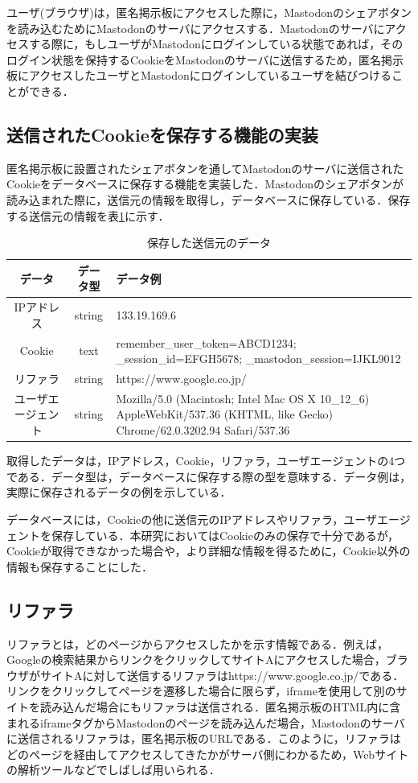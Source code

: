 \documentclass[10pt, a4paper]{jreport}
\begin{document}
ユーザ(ブラウザ)は，匿名掲示板にアクセスした際に，Mastodonのシェアボタンを読み込むためにMastodonのサーバにアクセスする．Mastodonのサーバにアクセスする際に，もしユーザがMastodonにログインしている状態であれば，そのログイン状態を保持するCookieをMastodonのサーバに送信するため，匿名掲示板にアクセスしたユーザとMastodonにログインしているユーザを結びつけることができる．

\subsection{送信されたCookieを保存する機能の実装}\label{sec: save_cookie}
匿名掲示板に設置されたシェアボタンを通してMastodonのサーバに送信されたCookieをデータベースに保存する機能を実装した．Mastodonのシェアボタンが読み込まれた際に，送信元の情報を取得し，データベースに保存している．保存する送信元の情報を表\ref{tb: buttons_database}に示す．

\begin{table}[H]
	\caption{保存した送信元のデータ}
	\label{tb: buttons_database}
	\begin{center}
		\begin{tabular}{ | c | c | p{8cm} | } \hline
			データ & データ型 & データ例 \\ \hline
			IPアドレス & string & 133.19.169.6 \\ \hline
			Cookie & text & remember\_user\_token=ABCD1234; \_session\_id=EFGH5678; \_mastodon\_session=IJKL9012  \\ \hline
			リファラ & string & https://www.google.co.jp/ \\ \hline
			ユーザエージェント & string &  Mozilla/5.0 (Macintosh; Intel Mac OS X 10\_12\_6) AppleWebKit/537.36 (KHTML, like Gecko) Chrome/62.0.3202.94 Safari/537.36 \\ \hline
		\end{tabular}
	\end{center}
\end{table}

取得したデータは，IPアドレス，Cookie，リファラ，ユーザエージェントの4つである．データ型は，データベースに保存する際の型を意味する．データ例は，実際に保存されるデータの例を示している．

データベースには，Cookieの他に送信元のIPアドレスやリファラ，ユーザエージェントを保存している．本研究においてはCookieのみの保存で十分であるが，Cookieが取得できなかった場合や，より詳細な情報を得るために，Cookie以外の情報も保存することにした．

\subsection*{リファラ}
リファラとは，どのページからアクセスしたかを示す情報である．例えば，Googleの検索結果からリンクをクリックしてサイトAにアクセスした場合，ブラウザがサイトAに対して送信するリファラはhttps://www.google.co.jp/である．リンクをクリックしてページを遷移した場合に限らず，iframeを使用して別のサイトを読み込んだ場合にもリファラは送信される．匿名掲示板のHTML内に含まれるiframeタグからMastodonのページを読み込んだ場合，Mastodonのサーバに送信されるリファラは，匿名掲示板のURLである．このように，リファラはどのページを経由してアクセスしてきたかがサーバ側にわかるため，Webサイトの解析ツールなどでしばしば用いられる．
\end{document}
